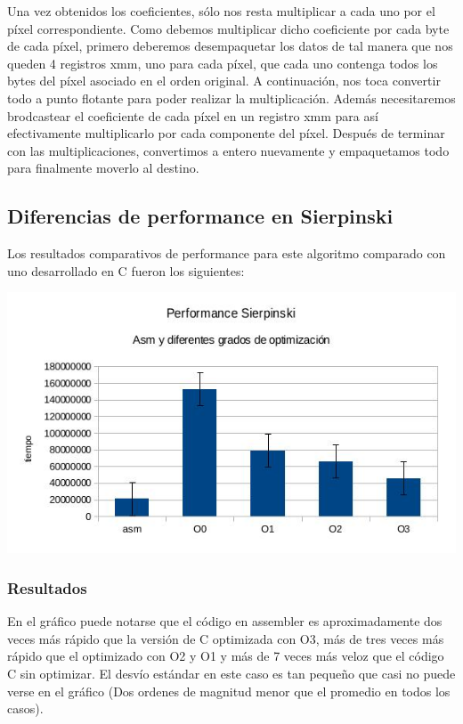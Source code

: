 \documentclass[a4paper]{article}
\begin{document}
Una vez obtenidos los coeficientes, sólo nos resta multiplicar a cada uno por el píxel correspondiente. Como debemos multiplicar dicho coeficiente por cada byte de cada píxel, primero deberemos desempaquetar los datos de tal manera que nos queden 4 registros xmm, uno para cada píxel, que cada uno contenga todos los bytes del píxel asociado en el orden original. A continuación, nos toca convertir todo a punto flotante para poder realizar la multiplicación. Además necesitaremos brodcastear el coeficiente de cada píxel en un registro xmm para así efectivamente multiplicarlo por cada componente del píxel. Después de terminar con las multiplicaciones, convertimos a entero nuevamente y empaquetamos todo para finalmente moverlo al destino.

\subsection{Diferencias de performance en Sierpinski}

Los resultados comparativos de performance para este algoritmo comparado con uno desarrollado en C fueron los siguientes:

  \begin{center}
  \includegraphics[scale=0.66]{Graficos1.4/sie/per.jpg}
  \end{center}

\subsubsection{Resultados}
En el gráfico puede notarse que el código en assembler es aproximadamente dos veces más rápido que la versión de C optimizada con O3, más de tres veces más rápido que el optimizado con O2 y O1 y más de 7 veces más veloz que el código C sin optimizar. El desvío estándar en este caso es tan pequeño que casi no puede verse en el gráfico (Dos ordenes de magnitud menor que el promedio en todos los casos).
\end{document}
